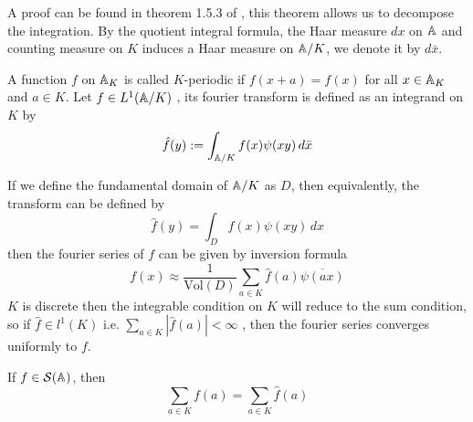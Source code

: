 A proof can be found in theorem 1.5.3 of \cite{deitmar2009principles}, this theorem allows us to decompose the integration. By the quotient integral formula, the Haar measure \(dx\) on \(\mathbb{A}\) and counting measure on \(K\) induces a Haar measure on \(\mathbb{A}/K\), we denote it by \(d\bar{x}\).

\begin{definition}
    A function \(f\) on \(\mathbb{A}_K\) is called \(K\)-periodic if \(f(x+a) = f(x)\) for all \(x \in \mathbb{A}_K\) and \(a \in K\). Let \(f \in L^1(\mathbb{A}/K)\) , its fourier transform is defined as an integrand on \(K\) by
    \[\hat{f}(y) : = \int_{\mathbb{A}/K} f(x) \psi(xy) \, d\bar{x}\]
\end{definition}

If we define the fundamental domain of \(\mathbb{A}/K\) as \(D\), then equivalently, the transform can be defined by
\[\hat{f}(y) = \int_D f(x) \psi(xy) \, dx\]
then the fourier series of \(f\) can be given by inversion formula
\[f(x) \approx \frac{1}{\mathrm{Vol}(D)} \sum_{a \in K}\hat{f}(a)\overline{\psi(ax)}\]
\(K\) is discrete then the integrable condition on \(K\) will reduce to the sum condition, so if \(\hat{f} \in l^1(K)\) i.e. \(\sum_{a \in K}|\hat{f}(a)|<\infty\) , then the fourier series converges uniformly to \(f\).


\begin{theorem} If \(f \in \mathcal{S}(\mathbb{A})\), then
\[\sum_{a \in K}f(a) = \sum_{a \in K}\hat{f}(a)\]
\end{theorem}


